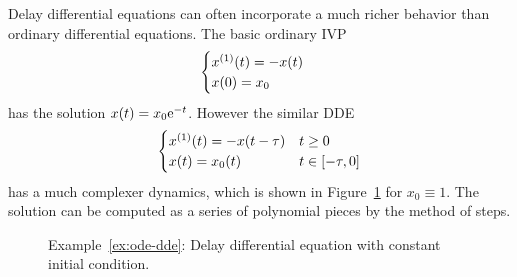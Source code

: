     \begin{example}\label{ex:ode-dde}
        Delay differential equations can often incorporate a much richer behavior than ordinary differential equations.
        The basic ordinary IVP
        \begin{equation*}
            \begin{cases}
                \D{x}(t) = -x(t)\\
                x(0) = x_0
            \end{cases}
        \end{equation*}
        has the solution $x(t)=x_0 \mathrm{e}^{-t}$. However the similar DDE
        \begin{equation*}
            \begin{cases}
                \D{x}(t) = -x(t-\tau) & t\geq 0\\
                x(t) = x_0(t) & t\in\compactum{-\tau}{0}
            \end{cases}
        \end{equation*}
        has a much complexer dynamics, which is shown in Figure~\ref{fig:plot-ex-dde} for $x_0\equiv 1$. The solution can be computed as a series of polynomial pieces by the method of steps.   
    \end{example}

    \begin{figure}[b]
        \centering
        
    	\caption{Example~\ref{ex:ode-dde}: Delay differential equation with constant initial condition.}
    	\label{fig:plot-ex-dde}
    \end{figure}
